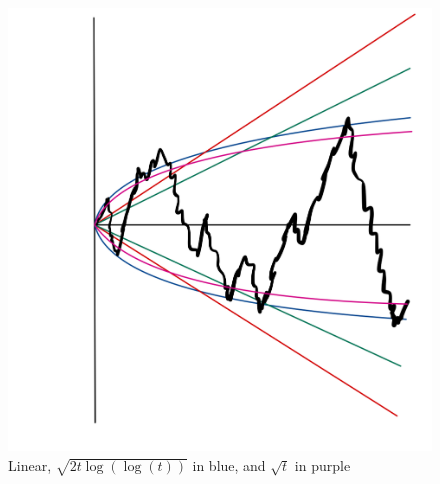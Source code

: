 \begin{figure}[h]
	\begin{center}
		\includegraphics[scale=0.1]{cones.jpeg}
		\caption*{Linear, $\sqrt{2t \log(\log(t))}$ in blue, and $\sqrt{t}$ in purple}
	\end{center}
\end{figure}

